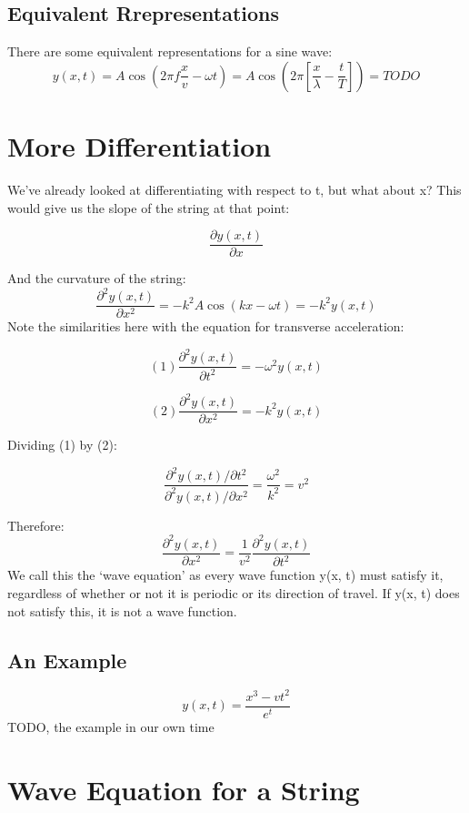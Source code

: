 \subsection*{Equivalent Rrepresentations}
There are some equivalent representations for a sine wave:
\[
    y(x,t) = A \cos \left(2 \pi f \frac{x}{v} - \omega t\right) = A \cos\left(2 \pi \left[\frac{x}{\lambda} - \frac{t}{T}\right]\right) = TODO
\]

\section*{More Differentiation}
We've already looked at differentiating with respect to t, but what about x? This would give us the slope of the string at that point:

\[
    \frac{\partial y(x, t)}{\partial x}
\]

And the curvature of the string:
\[
    \frac{\partial^2 y(x, t)}{\partial x^2} = -k^2 A \cos(kx - \omega t) = -k^2 y(x, t)
\]
Note the similarities here with the equation for transverse acceleration:


\begin{equation*}
    (1) \frac{\partial^2y(x, t)}{\partial t^2} = -\omega^2 y(x, t)
\end{equation*}

\begin{equation*}
    (2) \frac{\partial^2 y(x, t)}{\partial x^2} = -k^2 y(x, t)    
\end{equation*}

Dividing (1) by (2):

\[
    \frac{\partial^2y(x, t) / \partial t^2}{\partial^2 y(x, t)/\partial x^2} = \frac{\omega^2}{k^2} = v^2
\]

Therefore:
\[
    \frac{\partial^2 y(x, t)}{\partial x^2} = \frac{1}{v^2} \frac{\partial^2 y(x, t)}{\partial t^2}
\]
We call this the `wave equation' as every wave function y(x, t) must satisfy it, regardless of whether or not it is periodic or its direction of travel. If y(x, t) does not satisfy this, it is not a wave function.


\subsection*{An Example}
\[
    y(x, t) = \frac{x^3 - vt^2}{e^t}
\]
TODO, the example in our own time

\section*{Wave Equation for a String}

